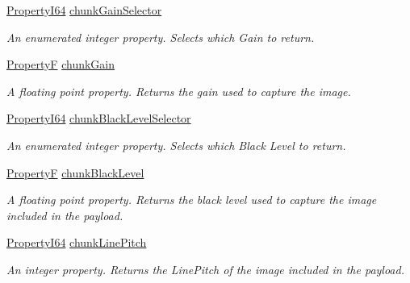 \begin{DoxyCompactItemize}
\hyperlink{group___common_interface_ga81749b2696755513663492664a18a893}{Property\+I64} \hyperlink{classmv_i_m_p_a_c_t_1_1acquire_1_1_gen_i_cam_1_1_chunk_data_control_a9d9f20487202b9100f118509754ecde4}{chunk\+Gain\+Selector}
\begin{DoxyCompactList}\small\item\em An enumerated integer property. Selects which Gain to return. \end{DoxyCompactList}\item 
\hyperlink{group___common_interface_gaf54865fe5a3d5cfd15f9a111b40d09f9}{Property\+F} \hyperlink{classmv_i_m_p_a_c_t_1_1acquire_1_1_gen_i_cam_1_1_chunk_data_control_ab8a83e2478ddaae9fc8b59d86cbe75a5}{chunk\+Gain}
\begin{DoxyCompactList}\small\item\em A floating point property. Returns the gain used to capture the image. \end{DoxyCompactList}\item 
\hyperlink{group___common_interface_ga81749b2696755513663492664a18a893}{Property\+I64} \hyperlink{classmv_i_m_p_a_c_t_1_1acquire_1_1_gen_i_cam_1_1_chunk_data_control_a63720c40901053497a17d6e30e95070a}{chunk\+Black\+Level\+Selector}
\begin{DoxyCompactList}\small\item\em An enumerated integer property. Selects which Black Level to return. \end{DoxyCompactList}\item 
\hyperlink{group___common_interface_gaf54865fe5a3d5cfd15f9a111b40d09f9}{Property\+F} \hyperlink{classmv_i_m_p_a_c_t_1_1acquire_1_1_gen_i_cam_1_1_chunk_data_control_a6d6b7d5f4bb92ae9f7d780d262ecd016}{chunk\+Black\+Level}
\begin{DoxyCompactList}\small\item\em A floating point property. Returns the black level used to capture the image included in the payload. \end{DoxyCompactList}\item 
\hyperlink{group___common_interface_ga81749b2696755513663492664a18a893}{Property\+I64} \hyperlink{classmv_i_m_p_a_c_t_1_1acquire_1_1_gen_i_cam_1_1_chunk_data_control_a058ff2d5680ac5df29d70b5c78542974}{chunk\+Line\+Pitch}
\begin{DoxyCompactList}\small\item\em An integer property. Returns the Line\+Pitch of the image included in the payload. \end{DoxyCompactList}\item 

\end{DoxyCompactItemize}
